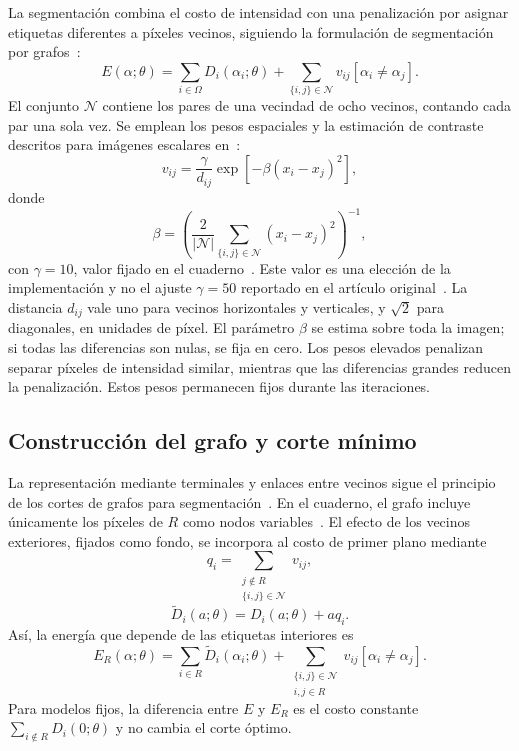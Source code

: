 La segmentación combina el costo de intensidad con una penalización por
asignar etiquetas diferentes a píxeles vecinos, siguiendo la formulación
de segmentación por grafos~\cite{boykov2001,rother2004}:
\begin{equation}
 E(\alpha;\theta)=\sum_{i\in\Omega}D_i(\alpha_i;\theta)
 +\sum_{\{i,j\}\in\mathcal{N}}v_{ij}[\alpha_i\ne\alpha_j].
 \label{eq:energia-segmentacion}
\end{equation}
El conjunto $\mathcal{N}$ contiene los pares de una vecindad de ocho
vecinos, contando cada par una sola vez. Se emplean los pesos espaciales
y la estimación de contraste descritos para imágenes escalares
en~\cite{rother2004}:
\begin{equation}
 v_{ij}=\frac{\gamma}{d_{ij}}\exp[-\beta(x_i-x_j)^2],
 \label{eq:pesos-espaciales}
\end{equation}
donde
\begin{equation}
 \beta=\left(\frac{2}{|\mathcal{N}|}
 \sum_{\{i,j\}\in\mathcal{N}}(x_i-x_j)^2\right)^{-1},
 \label{eq:contraste-espacial}
\end{equation}
con $\gamma=10$, valor fijado en el cuaderno~\cite{cuaderno}. Este valor
es una elección de la implementación y no el ajuste $\gamma=50$
reportado en el artículo original~\cite{rother2004}. La distancia $d_{ij}$ vale uno para vecinos horizontales
y verticales, y $\sqrt{2}$ para diagonales, en unidades de píxel. El
parámetro $\beta$ se estima sobre toda la imagen; si todas las diferencias
son nulas, se fija en cero. Los pesos elevados penalizan separar píxeles
de intensidad similar, mientras que las diferencias grandes reducen la
penalización. Estos pesos permanecen fijos durante las iteraciones.

\subsection{Construcción del grafo y corte mínimo}

La representación mediante terminales y enlaces entre vecinos sigue el
principio de los cortes de grafos para segmentación~\cite{boykov2001}.
En el cuaderno, el grafo incluye únicamente los píxeles de $R$ como nodos
variables~\cite{cuaderno}. El
efecto de los vecinos exteriores, fijados como fondo, se incorpora al costo
de primer plano mediante
\begin{equation}
 q_i=\sum_{\substack{j\notin R\\\{i,j\}\in\mathcal{N}}}v_{ij},
\end{equation}
\begin{equation}
 \widetilde D_i(a;\theta)=D_i(a;\theta)+a q_i.
\end{equation}
Así, la energía que depende de las etiquetas interiores es
\begin{equation}
 E_R(\alpha;\theta)=\sum_{i\in R}\widetilde D_i(\alpha_i;\theta)
 +\sum_{\substack{\{i,j\}\in\mathcal{N}\\i,j\in R}}
 v_{ij}[\alpha_i\ne\alpha_j].
 \label{eq:energia-reducida}
\end{equation}
Para modelos fijos, la diferencia entre $E$ y $E_R$ es el costo constante
$\sum_{i\notin R}D_i(0;\theta)$ y no cambia el corte óptimo.

